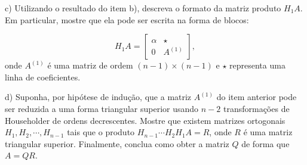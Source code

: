c) Utilizando o resultado do item b), descreva o formato da matriz produto $H_1A$. Em particular, mostre que ela pode ser escrita na forma de blocos:

$$
H_1A = \begin{bmatrix}
	\alpha & \star \\
	0 & A^{(1)}
\end{bmatrix},
$$
onde $A^{(1)}$ é uma matriz de ordem $(n - 1)\times (n - 1)$ e $\star$ representa uma linha de coeficientes.

d) Suponha, por hipótese de indução, que a matriz $A^{(1)}$ do item anterior pode ser reduzida a uma forma triangular superior usando $n - 2$ transformações de Householder de ordens decrescentes. Mostre que existem matrizes ortogonais $H_1, H_2, \cdots, H_{n - 1}$ tais que o produto $H_{n - 1}\cdots H_2H_1A = R$, onde $R$ é uma matriz triangular superior. Finalmente, conclua como obter a matriz $Q$ de forma que $A = QR$.
